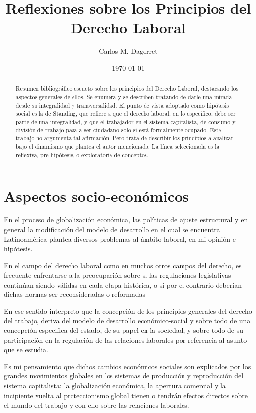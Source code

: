 \documentclass[a4paper]{article}
\title{Reflexiones sobre los Principios del Derecho Laboral}
\author{Carlos M. Dagorret}
\date{\today}
\begin{document}
\maketitle

\begin{abstract}
Resumen bibliográfico escueto sobre los principios del Derecho Laboral, destacando los aspectos generales de ellos. 
Se enumera y se describen tratando de darle una mirada desde su integralidad y transversalidad.
El punto de vista adoptado como hipótesis social es la de Standing, que refiere a que el derecho laboral, en lo específico, debe ser parte de una integralidad, y que el trabajador en el sistema capitalista, de consumo y división de trabajo pasa a ser ciudadano solo si está formalmente ocupado.
Este trabajo no argumenta tal afirmación. Pero trata de describir los principios a analizar bajo el dinamismo que plantea el autor mencionado.
La línea seleccionada es la reflexiva, pre hipótesis, o exploratoria de conceptos.
\end{abstract}

\section{Aspectos socio-económicos }
\label{sec:introduccion}

En el proceso de globalización económica, las políticas de ajuste estructural y en general la modificación del modelo de desarrollo en el cual se encuentra Latinoamérica plantea diversos problemas al ámbito laboral, en mi opinión e hipótesis. 

En el campo del derecho laboral como en muchos otros campos del derecho, es frecuente enfrentarse a la preocupación sobre si las regulaciones legislativas continúan siendo válidas en cada etapa histórica, o si por el contrario deberían dichas normas ser reconsideradas o reformadas. \cite{Altimir}

En ese sentido interpreto que la concepción de los principios generales del derecho del trabajo, deriva del modelo de desarrollo económico-social y sobre todo de una concepción especifica del estado, de su papel en la sociedad, y sobre todo de su participación en la regulación de las relaciones laborales por referencia al asunto que se estudia. 

Es mi pensamiento que dichos cambios económicos sociales son explicados por los grandes movimientos globales en los sistemas de producción y reproducción del sistema capitalista: la globalización económica, la apertura comercial y la incipiente vuelta al proteccionismo global tienen o tendrán efectos directos sobre el mundo del trabajo y con ello sobre las relaciones laborales. 
\end{document}
